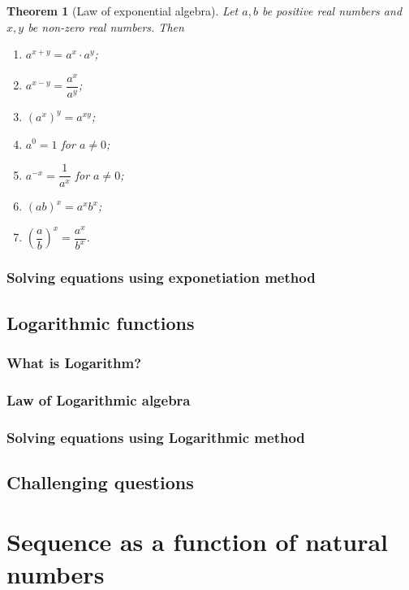 \documentclass[12pt]{article}
\newtheorem*{theorem}{Theorem}
\begin{document}
    \begin{theorem}[Law of exponential algebra]
        Let $a,b$ be positive real numbers and $x,y$ be non-zero real numbers. Then\begin{enumerate}
            \item $a^{x+y}=a^x\cdot a^y$;
            \item $a^{x-y}=\dfrac{a^x}{a^y}$;
            \item $(a^x)^y=a^{xy}$;
            \item $a^0=1$ for $a\neq 0$;
            \item $a^{-x}=\dfrac{1}{a^x}$ for $a\neq 0$;
            \item $(ab)^x=a^x b^x$;
            \item $(\dfrac{a}{b})^x=\dfrac{a^x}{b^x}$.
        \end{enumerate}
    \end{theorem}

    \subsubsection*{Solving equations using exponetiation method}

    \subsection{Logarithmic functions}

    \subsubsection*{What is Logarithm?}

    \subsubsection*{Law of Logarithmic algebra}

    \subsubsection*{Solving equations using Logarithmic method}

    \subsection{Challenging questions}

    \newpage

    \section{Sequence as a function of natural numbers}
\end{document}
